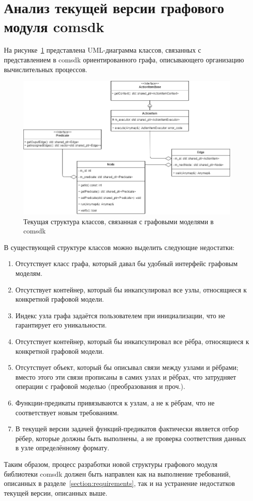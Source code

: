 \section{Анализ текущей версии графового модуля comsdk}
На рисунке~\ref{fig:oldGraphStructure} представлена UML-диаграмма классов, связанных с представлением в comsdk ориентированного графа, описывающего организацию вычислительных процессов.

\begin{figure}[!ht]
    \centering
    \includegraphics[width=\textwidth]{figures/structure.png}
    \caption{Текущая структура классов, связанная с графовыми моделями в comsdk}
    \label{fig:oldGraphStructure}
\end{figure}

В существующей структуре классов можно выделить следующие недостатки:
\begin{enumerate}[1)]
    \item Отсутствует класс графа, который давал бы удобный интерфейс графовым моделям.
    \item Отсутствует контейнер, который бы инкапсулировал все узлы, относящиеся к конкретной графовой модели.
    \item Индекс узла графа задаётся пользователем при инициализации, что не гарантирует его уникальности.
    \item Отсутствует контейнер, который бы инкапсулировал все рёбра, относящиеся к конкретной графовой модели.
    \item Отсутствует объект, который бы описывал связи между узлами и рёбрами; вместо этого эти связи прописаны в самих узлах и рёбрах, что затрудняет операции с графовой моделью (преобразования и проч.).
    \item Функции-предикаты привязываются к узлам, а не к рёбрам, что не соответствует новым требованиям.
    \item В текущей версии задачей функций-предикатов фактически является отбор рёбер, которые должны быть выполнены, а не проверка соответствия данных в узле определённому формату.
\end{enumerate}

Таким образом, процесс разработки новой структуры графового модуля библиотеки comsdk должен быть направлен как на выполнение требований, описанных в разделе~\ref{section:requirements}, так и на устранение недостатков текущей версии, описанных выше.